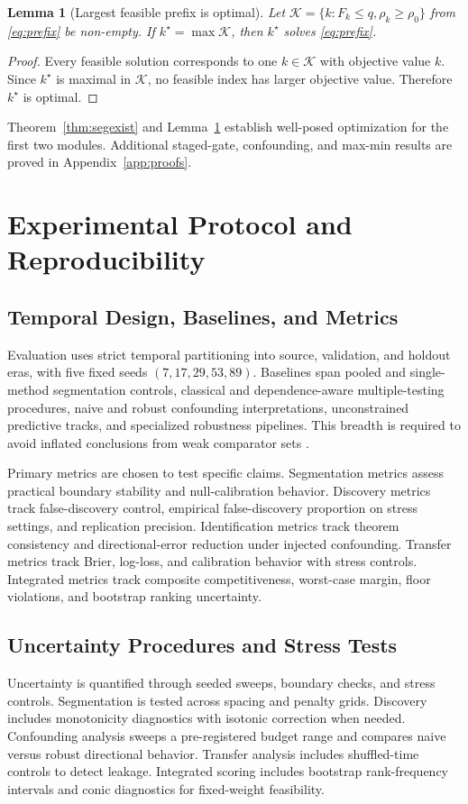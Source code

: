 \documentclass{article} %
\newtheorem{lemma}[theorem]{Lemma}
\begin{document}
\begin{lemma}[Largest feasible prefix is optimal]
Let $\mathcal{K}=\{k:F_k\le q,\rho_k\ge\rho_0\}$ from \eqref{eq:prefix} be non-empty. If $k^{\star}=\max\mathcal{K}$, then $k^{\star}$ solves \eqref{eq:prefix}.
\label{lem:prefix}
\end{lemma}
\begin{proof}
Every feasible solution corresponds to one $k\in\mathcal{K}$ with objective value $k$. Since $k^{\star}$ is maximal in $\mathcal{K}$, no feasible index has larger objective value. Therefore $k^{\star}$ is optimal. \qedhere
\end{proof}

Theorem~\ref{thm:segexist} and Lemma~\ref{lem:prefix} establish well-posed optimization for the first two modules. Additional staged-gate, confounding, and max-min results are proved in Appendix~\ref{app:proofs}.

\section{Experimental Protocol and Reproducibility}\label{sec:protocol}
\subsection{Temporal Design, Baselines, and Metrics}
Evaluation uses strict temporal partitioning into source, validation, and holdout eras, with five fixed seeds $(7,17,29,53,89)$. Baselines span pooled and single-method segmentation controls, classical and dependence-aware multiple-testing procedures, naive and robust confounding interpretations, unconstrained predictive tracks, and specialized robustness pipelines. This breadth is required to avoid inflated conclusions from weak comparator sets \citep{S14,S20,S21,S24}.

Primary metrics are chosen to test specific claims. Segmentation metrics assess practical boundary stability and null-calibration behavior. Discovery metrics track false-discovery control, empirical false-discovery proportion on stress settings, and replication precision. Identification metrics track theorem consistency and directional-error reduction under injected confounding. Transfer metrics track Brier, log-loss, and calibration behavior with stress controls. Integrated metrics track composite competitiveness, worst-case margin, floor violations, and bootstrap ranking uncertainty.

\subsection{Uncertainty Procedures and Stress Tests}
Uncertainty is quantified through seeded sweeps, boundary checks, and stress controls. Segmentation is tested across spacing and penalty grids. Discovery includes monotonicity diagnostics with isotonic correction when needed. Confounding analysis sweeps a pre-registered budget range and compares naive versus robust directional behavior. Transfer analysis includes shuffled-time controls to detect leakage. Integrated scoring includes bootstrap rank-frequency intervals and conic diagnostics for fixed-weight feasibility.
\end{document}
